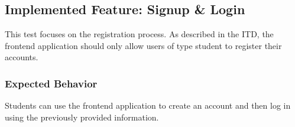 

\subsection{Implemented Feature:  Signup \& Login}
This test focuses on the registration process. As described in the ITD, the frontend application should only allow users of type student to register their accounts.
\subsubsection{Expected Behavior}
Students can use the frontend application to create an account and then log in using the previously provided information.
